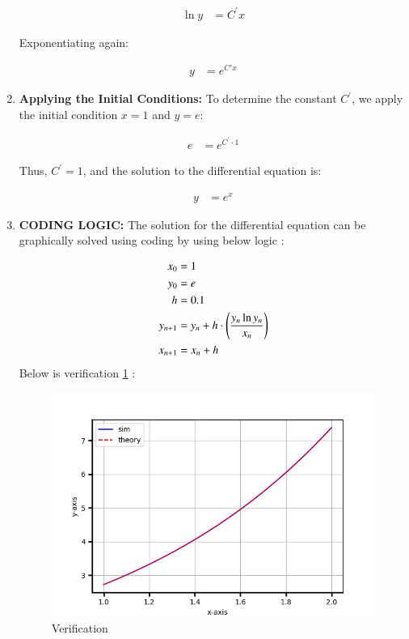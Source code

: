 \documentclass[journal]{IEEEtran}
\begin{document}
\begin{enumerate}
    \begin{align}
	    \ln{y} &= C^\prime x
    \end{align}

    Exponentiating again:

    \begin{align}
    y &= e^{C' x}
    \end{align}
    
    \item \textbf{Applying the Initial Conditions:} To determine the constant $ C^\prime $, we apply the initial condition $ x = 1 $ and $ y = e $:

    \begin{align}
    e &= e^{C^\prime \cdot 1}
    \end{align}

    Thus, $ C^\prime = 1 $, and the solution to the differential equation is:

    \begin{align}
    y &= e^x
    \end{align}

\item \textbf{CODING LOGIC:} The solution for the differential equation can be graphically solved using coding by using below logic :

\begin{align} 
	x_0 &= 1 \\ 
	y_0 &= e  \\
	h&=0.1 \\
	y_{n+1} &= y_{n} + h\cdot\left(\frac{y_{n}\ln{y_{n}}}{x_{n}}\right) \\ 
	x_{n+1} &= x_{n} + h 
\end{align}
\newpage
Below is verification \ref{fig:example} :
\begin{figure}[h]  %
    \centering  %
    \includegraphics[width=\columnwidth]{fig/Figure_1.png}  
    \caption{Verification}
    \label{fig:example}  %
\end{figure}


\end{enumerate}
\end{document}
